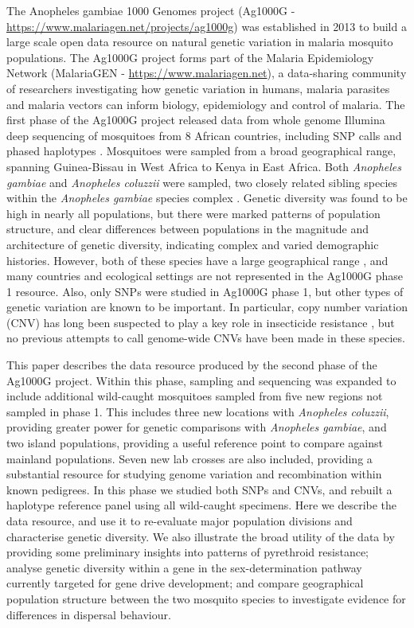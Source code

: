\documentclass[a4paper,11pt,abstracton,hidelinks]{scrartcl}
\begin{document}
%
The Anopheles gambiae 1000 Genomes project (Ag1000G - \url{https://www.malariagen.net/projects/ag1000g}) was established in 2013 to build a large scale open data resource on natural genetic variation in malaria mosquito populations.
%
The Ag1000G project forms part of the Malaria Epidemiology Network (MalariaGEN - \url{https://www.malariagen.net}), a data-sharing community of researchers investigating how genetic variation in humans, malaria parasites and malaria vectors can inform biology, epidemiology and control of malaria.
%
The first phase of the Ag1000G project released data from whole genome Illumina deep sequencing of mosquitoes from 8 African countries, including SNP calls and phased haplotypes \cite{Ag1000gConsortium2017}.
%
Mosquitoes were sampled from a broad geographical range, spanning Guinea-Bissau in West Africa to Kenya in East Africa.
%
Both \textit{Anopheles gambiae} and \textit{Anopheles coluzzii} were sampled, two closely related sibling species within the \textit{Anopheles gambiae} species complex \cite{coetzee2013}.
%
Genetic diversity was found to be high in nearly all populations, but there were marked patterns of population structure, and clear differences between populations in the magnitude and architecture of genetic diversity, indicating complex and varied demographic histories.
%
However, both of these species have a large geographical range \cite{wiebe2017}, and many countries and ecological settings are not represented in the Ag1000G phase 1 resource.
%
Also, only SNPs were studied in Ag1000G phase 1, but other types of genetic variation are known to be important.
%
In particular, copy number variation (CNV) has long been suspected to play a key role in insecticide resistance \cite{schimke1978, devonshire1991, weetman2015}, but no previous attempts to call genome-wide CNVs have been made in these species.


%
This paper describes the data resource produced by the second phase of the Ag1000G project.
%
Within this phase, sampling and sequencing was expanded to include additional wild-caught mosquitoes sampled from five new regions not sampled in phase 1.
%
This includes three new locations with \textit{Anopheles coluzzii}, providing greater power for genetic comparisons with \textit{Anopheles gambiae}, and two island populations, providing a useful reference point to compare against mainland populations.
%
Seven new lab crosses are also included, providing a substantial resource for studying genome variation and recombination within known pedigrees.
%
In this phase we studied both SNPs and CNVs, and rebuilt a haplotype reference panel using all wild-caught specimens.
%
Here we describe the data resource, and use it to re-evaluate major population divisions and characterise genetic diversity.
%
We also illustrate the broad utility of the data by providing some preliminary insights into patterns of pyrethroid resistance; analyse genetic diversity within a gene in the sex-determination pathway currently targeted for gene drive development; and compare geographical population structure between the two mosquito species to investigate evidence for differences in dispersal behaviour.
\end{document}
